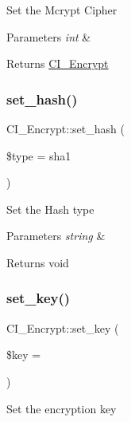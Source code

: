 Set the Mcrypt Cipher


\begin{DoxyParams}{Parameters}
{\em int} & \\
\hline
\end{DoxyParams}
\begin{DoxyReturn}{Returns}
\mbox{\hyperlink{class_c_i___encrypt}{C\+I\+\_\+\+Encrypt}} 
\end{DoxyReturn}
\mbox{\label{class_c_i___encrypt_aa313c5ec6129174310a0c60e8532ffc3}} 
\subsubsection{\texorpdfstring{set\+\_\+hash()}{set\_hash()}}
{\footnotesize\ttfamily C\+I\+\_\+\+Encrypt\+::set\+\_\+hash (\begin{DoxyParamCaption}\item[{}]{\$type = {\ttfamily \textquotesingle{}sha1\textquotesingle{}} }\end{DoxyParamCaption})}

Set the Hash type


\begin{DoxyParams}{Parameters}
{\em string} & \\
\hline
\end{DoxyParams}
\begin{DoxyReturn}{Returns}
void 
\end{DoxyReturn}
\mbox{\label{class_c_i___encrypt_ae8aec29f6c4b90380a014a80a26adb18}} 
\subsubsection{\texorpdfstring{set\+\_\+key()}{set\_key()}}
{\footnotesize\ttfamily C\+I\+\_\+\+Encrypt\+::set\+\_\+key (\begin{DoxyParamCaption}\item[{}]{\$key = {\ttfamily \textquotesingle{}\textquotesingle{}} }\end{DoxyParamCaption})}

Set the encryption key



